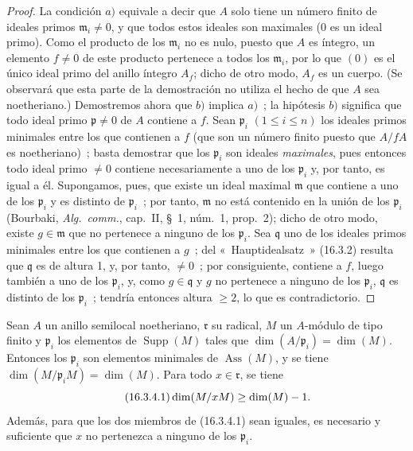 \begin{proof}
La condición $a)$ equivale a decir que $A$ solo tiene un número finito de
ideales primos $\mathfrak{m}_i\neq0$, y que todos estos ideales son maximales
($0$ es un ideal primo). Como el producto de los $\mathfrak{m}_i$ no es nulo,
puesto que $A$ es íntegro, un elemento $f\neq0$ de este producto pertenece a
todos los $\mathfrak{m}_i$, por lo que $(0)$ es el único ideal primo del anillo
íntegro $A_f$; dicho de otro modo, $A_f$ es un cuerpo. (Se observará que esta
parte de la demostración no utiliza el hecho de que $A$ sea noetheriano.)
Demostremos ahora que $b)$ implica $a)$~; la hipótesis $b)$ significa que todo
ideal primo $\mathfrak{p}\neq0$ de $A$ contiene a $f$. Sean $\mathfrak{p}_i$
$(1\leq i\leq n)$ los ideales primos minimales entre los que contienen a $f$
(que son un número finito puesto que $A/fA$ es noetheriano)~; basta demostrar
que los $\mathfrak{p}_i$ son ideales \emph{maximales}, pues entonces todo ideal
primo $\neq0$ contiene necesariamente a uno de los $\mathfrak{p}_i$ y, por
tanto, es igual a él. Supongamos, pues, que existe un ideal maximal
$\mathfrak{m}$ que contiene a uno de los $\mathfrak{p}_i$ y es distinto de
$\mathfrak{p}_i$~; por tanto, $\mathfrak{m}$ no está contenido en la unión de
los $\mathfrak{p}_i$ (Bourbaki, \emph{Alg.~comm.}, cap.~II, \S~1, núm.~1,
prop.~2); dicho de otro modo, existe $g\in\mathfrak{m}$ que no pertenece a
ninguno de los $\mathfrak{p}_i$. Sea $\mathfrak{q}$ uno de los ideales primos
minimales entre los que contienen a $g$~; del «~Hauptidealsatz~» (16.3.2)
resulta que $\mathfrak{q}$ es de altura 1, y, por tanto, $\neq0$~; por
consiguiente, contiene a $f$, luego también a uno de los $\mathfrak{p}_i$, y,
como $g\in\mathfrak{q}$ y $g$ no pertenece a ninguno de los
$\mathfrak{p}_i$, $\mathfrak{q}$ es distinto de los $\mathfrak{p}_i$~; tendría
entonces altura $\geq2$, lo que es contradictorio.
\end{proof}

\begin{proposition}[16.3.4]
\label{0.16.3.4-fr}
Sean $A$ un anillo semilocal noetheriano, $\mathfrak{r}$ su radical, $M$ un
$A$-módulo de tipo finito y $\mathfrak{p}_i$ los elementos de
$\operatorname{Supp}(M)$ tales que
$\dim(A/\mathfrak{p}_i)=\dim(M)$. Entonces los $\mathfrak{p}_i$ son elementos
minimales de $\operatorname{Ass}(M)$, y se tiene
$\dim(M/\mathfrak{p}_iM)=\dim(M)$. Para todo $x\in\mathfrak{r}$, se tiene
\begin{equation}
\label{0.16.3.4.1-fr}
\tag{16.3.4.1}
  \dim(M/xM)\geq\dim(M)- 1.
\end{equation}
Además, para que los dos miembros de \textup{(16.3.4.1)} sean iguales, es necesario y
suficiente que $x$ no pertenezca a ninguno de los $\mathfrak{p}_i$.
\end{proposition}


